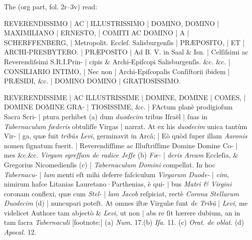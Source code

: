 \documentclass[abbrwidth=7em,shorttitlesize=55]{ees}
\begin{document}
\vspace*{-\baselineskip}
\begin{flushleft}
The  (org part, fol. 2r–3v) read:
\begin{description}[labelwidth=3em,leftmargin=3.5em]
  \item[fol. 2r] REVERENDISSIMO | AC | ILLUSTRISSIMO | DOMINO, DOMINO | MAXIMILIANO | ERNESTO, | COMITI AC DOMINO | A | SCHERFFENBERG, | Metropolit. Eccleſ. Salisburgenſis | PRÆPOSITO, | ET | ARCHI-PRESBYTERO. | PRÆPOSITO | Ad B. V. in Saal \& Isn. | Celſiſsimi ac Reverendiſsimi S.R.I.Prin- | cipis \& Archi-Epiſcopi Salisburgenſis. \&c. \&c. | CONSILIARIO INTIMO, | Nec non | Archi-Epiſcopalis Conſiſtorii ibidem | PRÆSIDI, \&c. | DOMINO DOMINO | GRATIOSISSIMO.
  \item[fol. 2v] REVERENDISSIME | AC ILLUSTRISSIME | DOMINE, DOMINE | COMES, | DOMINE DOMINE GRA- | TIOSISSIME, \&c. | FActum planè prodigioſum Sacra Scri- | ptura perhibet (a) dum \textit{duodecim} tribus Iſraël | ſuas in \textit{Tabernaculum fœderis} obtuliſſe Virgas | narrat. At ex his \textit{duodecim} unica tantùm Vir- | ga, quæ fuit \textit{tribûs Levi}, germinavit in Arcâ; | Eò quòd ſuper illam \textit{Aaronis} nomen ſignatum fuerit. | Reverendiſſime ac Illuſtriſſime Domine Domine Co- | mes \&c.\&c. \textit{Virgam egreſſam de radice Jeſſe} (b) \textit{Fœ-} | \textit{deris Arcam} Eccleſia, \& Gregorius Nicomedienſis (c) | \textit{Tabernaculum Domini} compellat. In hoc \textit{Tabernacu-} | \textit{lum} menti eſt mihi deferre faſciculum \textit{Virgarum Duode-} | \textit{cim}, nimirum haſce Litanias Lauretano·Parthenias, è qui- | bus \textit{Matri \& Virgini} coronam conflexi, quæ cum \textit{Stel-} | \textit{lam Jacob} reſpiciat, rectè \textit{Corona Stellarum Duodecim} (d) | nuncupari poteſt. At omnes iſtæ Virgulæ ſunt \textit{de Tribû} | \textit{Levi}, me videlicet Authore tam abjectò \& \textit{Levi}, ut non | abs re ſit hærere dubium, an in tam ſacra \textit{Tabernaculi} [footnote:] (a) \textit{Num.} 17.(b) \textit{Iſa.} 11. (c) \textit{Orat. de oblat.} (d) \textit{Apocal.} 12.

\end{description}
\end{flushleft}
\end{document}
